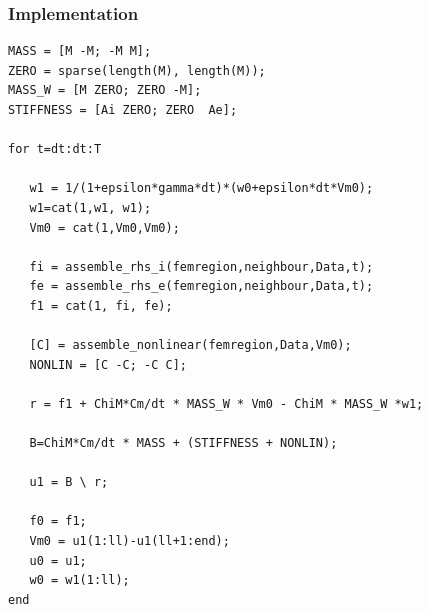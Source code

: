\documentclass[a4paper,11pt]{article}
\begin{document}
\subsubsection{Implementation}
\begin{verbatim}
MASS = [M -M; -M M];
ZERO = sparse(length(M), length(M));
MASS_W = [M ZERO; ZERO -M];
STIFFNESS = [Ai ZERO; ZERO  Ae];

for t=dt:dt:T

   w1 = 1/(1+epsilon*gamma*dt)*(w0+epsilon*dt*Vm0);
   w1=cat(1,w1, w1);
   Vm0 = cat(1,Vm0,Vm0);

   fi = assemble_rhs_i(femregion,neighbour,Data,t);
   fe = assemble_rhs_e(femregion,neighbour,Data,t);
   f1 = cat(1, fi, fe);

   [C] = assemble_nonlinear(femregion,Data,Vm0);
   NONLIN = [C -C; -C C];

   r = f1 + ChiM*Cm/dt * MASS_W * Vm0 - ChiM * MASS_W *w1;

   B=ChiM*Cm/dt * MASS + (STIFFNESS + NONLIN);

   u1 = B \ r;

   f0 = f1;
   Vm0 = u1(1:ll)-u1(ll+1:end);
   u0 = u1;
   w0 = w1(1:ll);
end
\end{verbatim}
\vspace{4mm}
\end{document}

